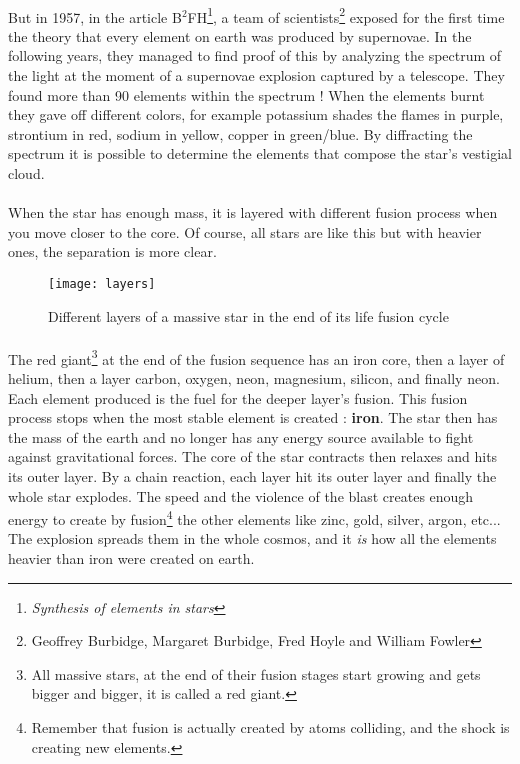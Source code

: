 \documentclass[a4paper, 11pt]{article} %
\begin{document}
\paragraph*{}

 But in 1957, in the article B$^2$FH\footnote{\textit{Synthesis of elements in stars}}, a team of scientists\footnote{Geoffrey Burbidge, Margaret Burbidge, Fred Hoyle and William Fowler} exposed for the first time the theory that every element on earth was produced by supernovae. In the following years, they managed to find proof of this by analyzing the spectrum of the light at the moment of a supernovae explosion captured by a telescope. They found more than 90 elements within the spectrum ! When the elements burnt they gave off different colors, for example potassium shades the flames in purple, strontium in red, sodium in yellow, copper in green/blue. By diffracting the spectrum it is possible to determine the elements that compose the star's vestigial cloud.

\paragraph*{}
When the star has enough mass, it is layered with different fusion process when you move closer to the core. Of course, all stars are like this but with heavier ones, the separation is more clear.

\begin{figure}[h]
\centering
\texttt{[image: layers]}
\caption{Different layers of a massive star in the end of its life fusion cycle}
\end{figure}

\paragraph*{}
The red giant\footnote{All massive stars, at the end of their fusion stages start growing and gets bigger and bigger, it is called a red giant.} at the end of the fusion sequence has an iron core, then a layer of helium, then a layer carbon, oxygen, neon,  magnesium, silicon, and finally neon. Each element produced is the fuel for the deeper layer's  fusion. This fusion process stops when the most stable element is created : \textbf{iron}. The star then has the mass of the earth and no longer has any energy source available to fight against gravitational forces. The core of the star contracts then relaxes and hits its outer layer. By a chain reaction, each layer hit its outer layer and finally the whole star explodes. The speed and the violence of the blast creates enough energy to create by fusion\footnote{Remember that fusion is actually created by atoms colliding, and the shock is creating new elements.} the other elements like zinc, gold, silver, argon, etc... The explosion spreads them in the whole cosmos, and it \textit{is} how all the elements heavier than iron were created on earth.
\end{document}

